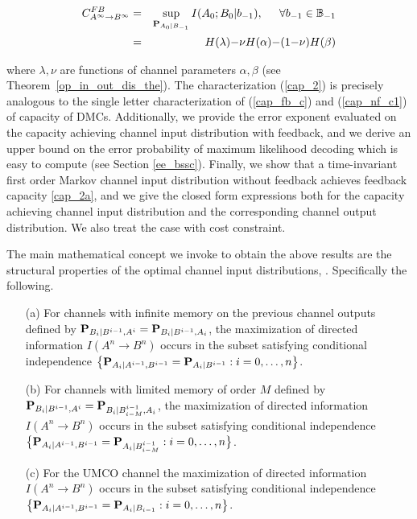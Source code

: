 \documentclass[11pt, a4paper, journal,onecolumn]{IEEEtran}
\newcommand{\mb}{\mathbb}
\newcommand{\rar}{\rightarrow}
\newcommand{\bea}{\begin{eqnarray}}
\newcommand{\eea}{\end{eqnarray}}
\newcommand{\hst}{\hspace{.2in}}
\begin{document}
\bea
C_{A^\infty \rar B^\infty}^{FB}&=&\sup_{ {\bf P}_{A_0|B_{-1}}} I(A_0;B_0|b_{-1}), \hst \forall b_{-1} \in {\mb B}_{-1}\label{cap_2}\\&=&H(\lambda){-}\nu H({\alpha}){-}(1{-}\nu)H({\beta}) \label{cap_2a}
\eea
\par where $\lambda, \nu$ are functions of channel parameters $\alpha, \beta$ (see Theorem~\ref{op_in_out_dis_the}). The characterization (\ref{cap_2}) is precisely analogous to the single letter characterization of   (\ref{cap_fb_c}) and (\ref{cap_nf_c1}) of capacity of DMCs. Additionally, we provide the error exponent evaluated on the capacity achieving channel input distribution with feedback, and we derive an upper bound on the error probability of maximum likelihood decoding which is easy to compute (see Section \ref{ee_bssc}). Finally, we show that a time-invariant first order Markov channel input distribution without feedback achieves feedback capacity \eqref{cap_2a}, and we give the closed form expressions both for the capacity achieving channel input distribution and the corresponding channel output distribution. We also treat the case with cost constraint.
\par The main mathematical concept we invoke to obtain the above results 
are the structural properties of the optimal channel input distributions, \cite{kourtellaris2015information, kourtellarisISIT2016}. Specifically the following.
\begin{itemize}
\item[(a)] For  channels with infinite memory on the previous channel outputs defined by ${\bf P}_{B_i|B^{i-1}, A^i}={\bf P}_{B_i|B^{i-1}, A_i}$,  the maximization of directed information   $I(A^n \rar B^n)$ occurs in the  subset satisfying conditional independence $\big\{{\bf P}_{A_i|A^{i-1}, B^{i-1}}={\bf P}_{A_i|B^{i-1}}: i=0, \ldots, n\big\}$.
\item[(b)] For  channels with limited memory of order $M$ defined by ${\bf P}_{B_i|B^{i-1}, A^i}={\bf P}_{B_i|B_{i-M}^{i-1}, A_i}$, the maximization of directed information   $I(A^n \rar B^n)$ occurs in the  subset satisfying conditional independence $\big\{{\bf P}_{A_i|A^{i-1}, B^{i-1}}={\bf P}_{A_i|B_{i-M}^{i-1}}: i=0, \ldots, n\big\}$.
\item[(c)] For the UMCO channel the maximization of directed information   $I(A^n \rar B^n)$ occurs in the  subset satisfying conditional independence $\big\{{\bf P}_{A_i|A^{i-1}, B^{i-1}}={\bf P}_{A_i|B_{i-1}}: i=0, \ldots, n\big\}$.
\end{itemize}
\end{document}
